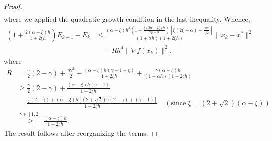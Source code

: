 \documentclass[pdflatex,sn-mathphys-num]{sn-jnl}
\theoremstyle{thmstyleone}
\theoremstyle{thmstyletwo}
\theoremstyle{thmstylethree}
\begin{document}
\begin{appendices}
\begin{proof}
\begin{align*}
\end{align*}
where we applied the quadratic growth condition in the last inequality. Whence,
\begin{align*}
\left( 1 + \frac{ 2(\alpha-\xi) h }{1+2\xi h} \right)E_{k+1} - E_k
&\le \frac{ (\alpha-\xi) h^3 \left( 1 + \frac{\xi(3\alpha-2\xi)h}{2\xi-\alpha} \right) \left[ \xi(2\xi-\alpha) - \frac{\mu\gamma}{\sqrt{2}} \right]}{(1+\alpha h)\left(1+2\xi h\right)}\| x_k - x^* \|^2 \\ 
&\quad - R h^4 \| \nabla f(x_k) \|^2,
\end{align*}
where
\begin{align*}
R 
&= \frac{\gamma}{2}(2-\gamma) + \frac{\eta\gamma^2}{2} + \frac{ (\alpha-\xi) h (\gamma-1+\eta) }{ 1 + 2\xi h } + \frac{ \gamma(\alpha-\xi) h }{(1+\alpha h)( 1 + 2\xi h )} \\
&\ge \frac{\gamma}{2}(2-\gamma) + \frac{ (\alpha-\xi) h (\gamma-1) }{ 1 + 2\xi h } \\
&= \frac{ \frac{\gamma}{2}(2-\gamma) + (\alpha-\xi) h \left[ (2+\sqrt{2})\gamma(2-\gamma) + (\gamma-1) \right]  }{ 1 + 2\xi h } \quad \left(\text{since }\xi = (2+ \sqrt{2}) (\alpha-\xi) \right)\\
&\stackrel{\gamma\in[1,2]}\ge 
  \frac{ (\alpha-\xi) h}{ 1 + 2\xi h }.   
\end{align*}
The result follows after reorganizing the terms.
\end{proof}


\end{appendices}
\end{document}
